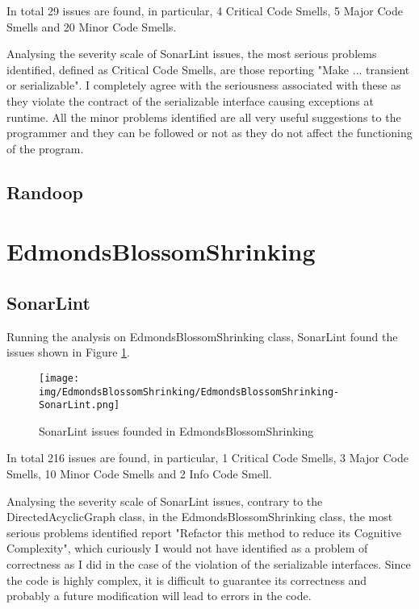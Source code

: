 \documentclass[a4paper,12pt]{article} %
\begin{document}
	In total 29 issues are found, in particular, 4 Critical Code Smells, 5 Major Code Smells and 20 Minor Code Smells.
	
	Analysing  the severity scale of SonarLint issues, the most serious problems identified, defined as Critical Code Smells, are those reporting "Make ... transient or serializable". I completely agree with the seriousness associated with these as they violate the contract of the serializable interface causing exceptions at runtime.
	All the minor problems identified are all very useful suggestions to the programmer and they can be followed or not as they do not affect the functioning of the program.
		
	\subsection*{Randoop}
	
	\section{EdmondsBlossomShrinking}
	
	\subsection*{SonarLint}
	Running the analysis on EdmondsBlossomShrinking class, SonarLint found the issues shown in Figure \ref{fig:sonar-ed}.
	
	\begin{figure}[H]
		\centering
		\texttt{[image: img/EdmondsBlossomShrinking/EdmondsBlossomShrinking-SonarLint.png]}	
		\caption{SonarLint issues founded in EdmondsBlossomShrinking}
		\label{fig:sonar-ed}
	\end{figure}
	
	In total 216 issues are found, in particular, 1 Critical Code Smells, 3 Major Code Smells, 10 Minor Code Smells and 2 Info Code Smell.
	
	Analysing  the severity scale of SonarLint issues, contrary to the DirectedAcyclicGraph class, in the EdmondsBlossomShrinking class, the most serious problems identified report "Refactor this method to reduce its Cognitive Complexity", which curiously I would not have identified as a problem of correctness as I did in the case of the violation of the serializable interfaces. 
	Since the code is highly complex, it is difficult to guarantee its correctness and probably a future modification will lead to errors in the code.
	
\end{document}
